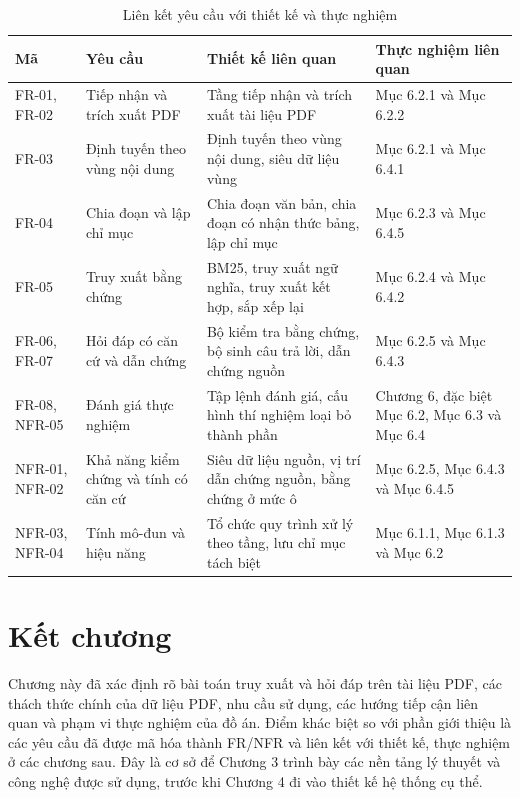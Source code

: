 \documentclass[../DoAn.tex]{subfiles}
\begin{document}
\begin{table}[H]
\centering
\scriptsize
\renewcommand{\arraystretch}{1.2}
\caption{Liên kết yêu cầu với thiết kế và thực nghiệm}
\label{tab:requirements-traceability}
\begin{tabularx}{\textwidth}{
    |>{\centering\arraybackslash}p{}
    |>{\raggedright\arraybackslash}p{}
    |>{\raggedright\arraybackslash}p{}
    |>{\raggedright\arraybackslash}X|
}
\hline
\textbf{Mã} & \textbf{Yêu cầu} & \textbf{Thiết kế liên quan} & \textbf{Thực nghiệm liên quan} \\
\hline
FR-01, FR-02 & Tiếp nhận và trích xuất PDF &
Tầng tiếp nhận và trích xuất tài liệu PDF &
Mục 6.2.1 và Mục 6.2.2\\
\hline
FR-03 & Định tuyến theo vùng nội dung &
Định tuyến theo vùng nội dung, siêu dữ liệu vùng &
Mục 6.2.1 và Mục 6.4.1\\
\hline
FR-04 & Chia đoạn và lập chỉ mục &
Chia đoạn văn bản, chia đoạn có nhận thức bảng, lập chỉ mục &
Mục 6.2.3 và Mục 6.4.5 \\
\hline
FR-05 & Truy xuất bằng chứng &
BM25, truy xuất ngữ nghĩa, truy xuất kết hợp, sắp xếp lại &
Mục 6.2.4 và Mục 6.4.2 \\
\hline
FR-06, FR-07 & Hỏi đáp có căn cứ và dẫn chứng &
Bộ kiểm tra bằng chứng, bộ sinh câu trả lời, dẫn chứng nguồn &
Mục 6.2.5 và Mục 6.4.3 \\
\hline
FR-08, NFR-05 & Đánh giá thực nghiệm &
Tập lệnh đánh giá, cấu hình thí nghiệm loại bỏ thành phần &
Chương 6, đặc biệt Mục 6.2, Mục 6.3 và Mục 6.4 \\
\hline
NFR-01, NFR-02 & Khả năng kiểm chứng và tính có căn cứ &
Siêu dữ liệu nguồn, vị trí dẫn chứng nguồn, bằng chứng ở mức ô &
Mục 6.2.5, Mục 6.4.3 và Mục 6.4.5 \\
\hline
NFR-03, NFR-04 & Tính mô-đun và hiệu năng &
Tổ chức quy trình xử lý theo tầng, lưu chỉ mục tách biệt &
Mục 6.1.1, Mục 6.1.3 và Mục 6.2 \\
\hline
\end{tabularx}
\end{table}

\section{Kết chương}

Chương này đã xác định rõ bài toán truy xuất và hỏi đáp trên tài liệu PDF, các
thách thức chính của dữ liệu PDF, nhu cầu sử dụng, các hướng tiếp cận liên quan
và phạm vi thực nghiệm của đồ án. Điểm khác biệt so với phần giới thiệu là các
yêu cầu đã được mã hóa thành FR/NFR và liên kết với thiết kế, thực nghiệm ở các
chương sau. Đây là cơ sở để Chương 3 trình bày các nền tảng lý thuyết và công
nghệ được sử dụng, trước khi Chương 4 đi vào thiết kế hệ thống cụ thể.
\end{document}

